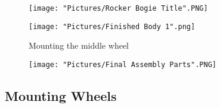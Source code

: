 \documentclass[12pt]{article}
\begin{document}
\begin{figure}[H]
  \centering
  \begin{minipage}[b]{0.45\textwidth}
    \texttt{[image: "Pictures/Rocker Bogie Title".PNG]}
  \end{minipage}
  \hfill
  \begin{minipage}[b]{0.45\textwidth}
    \texttt{[image: "Pictures/Finished Body 1".png]}
  \end{minipage}
  \caption{Mounting the middle wheel}
\end{figure}


\begin{figure}[H]
	\centering
	\texttt{[image: "Pictures/Final Assembly Parts".PNG]}
\end{figure}


\subsection{Mounting Wheels}
\end{document}

